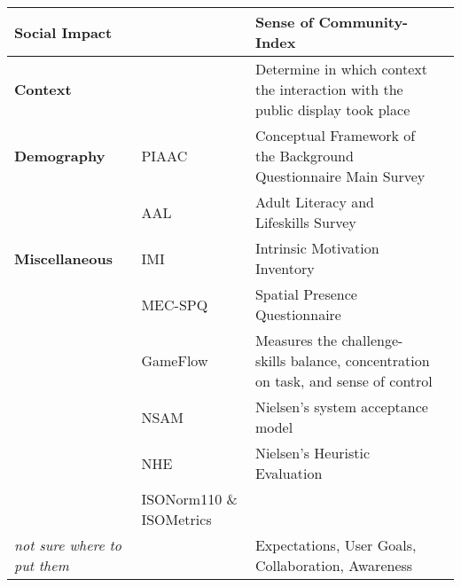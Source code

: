 \begin{tabular}{p{3.5cm}p{4.5cm}p{7.5cm}c}
\textbf{Social Impact} & & Sense of Community-Index & \cite{Ballagas2005, cheverst2005hermes, Cheverst2008}   \\ \hline



\textbf{Context} &  & Determine in which context the interaction with the public display took place &   \\ \hline




\textbf{Demography} & PIAAC & Conceptual Framework of the Background Questionnaire Main Survey & \\
& AAL & Adult Literacy and Lifeskills Survey & \cite{SurveysAAL} \\ \hline




\textbf{Miscellaneous} & IMI \cite{choi1996effect, mcauley1989psychometric} & Intrinsic Motivation Inventory & \cite{Huang2004, jacucci2010worldsofinformation}  \\
& MEC-SPQ & Spatial Presence Questionnaire & \cite{Huang2004, jacucci2010worldsofinformation}   \\
& GameFlow \cite{sweetser2005gameflow} & Measures the challenge-skills balance, concentration on task, and sense of control
 & \cite{Huang2004}  \\
& NSAM & Nielsen's system acceptance model & \cite{ojala2010ubi, jacucci2010worldsofinformation}  \\
& NHE \cite{nielsen1994usability} & Nielsen's Heuristic Evaluation & \\
& ISONorm110 \& ISOMetrics & \cite{Chur2014Questionnaires} & \\


\textit{not sure where to put them} &  & Expectations, User Goals, Collaboration, Awareness &   \\


\bottomrule
\end{tabular}
